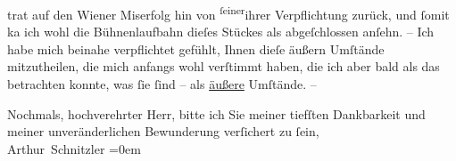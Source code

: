               trat auf den Wiener Miserfolg hin von \substVorne{}\textsuperscript{ſeiner}\substDazwischen{}ihrer\substHinten{} Verpflichtung zurück, und ſomit ka{\geminationn} ich wohl
               die Bühnenlaufbahn dieſes Stückes als abgeſchlossen anſehn. – Ich {\pb}habe mich beinahe verpflichtet gefühlt, Ihnen
               dieſe äußern Umſtände mitzutheilen, die mich anfangs wohl verſtimmt haben, die ich
               aber bald als das betrachten konnte, was ſie ſind – als \uline{äußere} Umſtände. –\pend
           
\pstart
           Nochmals, hochverehrter Herr, bitte ich Sie meiner tiefſten Dankbarkeit und
               meiner unveränderlichen Bewunderung verſichert zu ſein,{\\[\baselineskip]}\spacefill\mbox{Arthur Schnitzler}\pend
           \leftskip=0em{}\endnumbering{}  
      